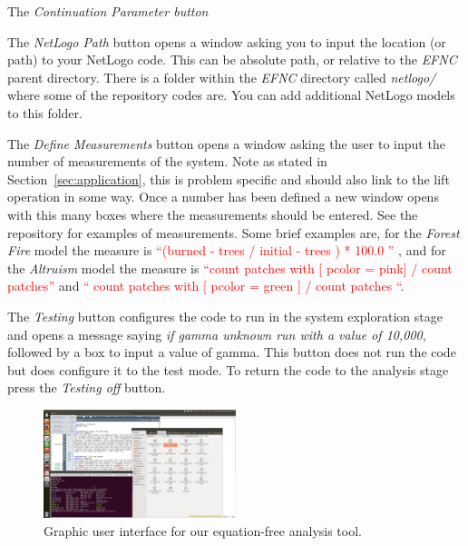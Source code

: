 \documentclass[11pt]{article}
\begin{document}
The {\it Continuation Parameter button} 

The {\it NetLogo Path} button opens a window asking you to input the location (or path) to your NetLogo code. This can be absolute path, or relative to the {\it EFNC} parent directory. There is a folder within the {\it EFNC} directory called {\it netlogo/} where some of the repository codes are. You can add additional NetLogo models to this folder. 

The {\it Define Measurements} button opens a window asking the user to input the number of measurements of the system. Note as stated in Section~\ref{sec:application}, this is problem specific and should also link to the lift operation in some way. Once a number has been defined a new window opens with this many boxes where the measurements should be entered. See the repository for examples of measurements. Some brief examples are, for the {\it Forest Fire} model the measure is \textcolor{red}{``(burned - trees / initial - trees ) * 100.0 '' }, and for the {\it Altruism} model the measure is \textcolor{red}{``count patches with [ pcolor = pink] / count patches''} and  \textcolor{red}{`` count patches with [ pcolor = green ] / count patches ``}.


The {\it Testing} button configures the code to run in the system exploration stage and opens a message saying {\it if gamma unknown run with a value of 10,000}, followed by a box to input a value of gamma. This button does not run the code but does configure it to the test mode. To return the code to the analysis stage press the {\it Testing off} button.


\begin{figure}[h]
	\centering
	\includegraphics[width=0.5\textwidth, trim= 2.32cm 29.6cm 56.16cm 1cm, clip=true]{../figs/GUI.png}
	\caption{Graphic user interface for our equation-free analysis tool. \label{fig:GUI}}
\end{figure} 
\end{document}
